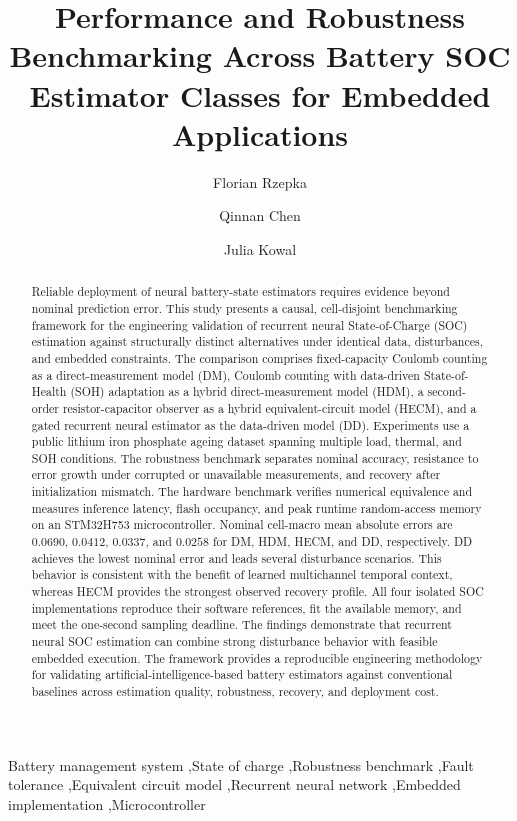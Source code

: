 \documentclass[review,nopreprintline]{elsarticle}
\date{}
\newif\ifanonsubmission
\begin{document}
\begin{frontmatter}
\title{Performance and Robustness Benchmarking Across Battery SOC Estimator Classes for Embedded Applications}
\ifanonsubmission
\author{Anonymous}
\else
\author[1]{Florian Rzepka}
\author[1]{Qinnan Chen}
\author[1]{Julia Kowal}
\fi
\begin{abstract}
Reliable deployment of neural battery-state estimators requires evidence beyond nominal prediction error. This study presents a causal, cell-disjoint benchmarking framework for the engineering validation of recurrent neural State-of-Charge (SOC) estimation against structurally distinct alternatives under identical data, disturbances, and embedded constraints. The comparison comprises fixed-capacity Coulomb counting as a direct-measurement model (DM), Coulomb counting with data-driven State-of-Health (SOH) adaptation as a hybrid direct-measurement model (HDM), a second-order resistor-capacitor observer as a hybrid equivalent-circuit model (HECM), and a gated recurrent neural estimator as the data-driven model (DD). Experiments use a public lithium iron phosphate ageing dataset spanning multiple load, thermal, and SOH conditions. The robustness benchmark separates nominal accuracy, resistance to error growth under corrupted or unavailable measurements, and recovery after initialization mismatch. The hardware benchmark verifies numerical equivalence and measures inference latency, flash occupancy, and peak runtime random-access memory on an STM32H753 microcontroller. Nominal cell-macro mean absolute errors are $0.0690$, $0.0412$, $0.0337$, and $0.0258$ for DM, HDM, HECM, and DD, respectively. DD achieves the lowest nominal error and leads several disturbance scenarios. This behavior is consistent with the benefit of learned multichannel temporal context, whereas HECM provides the strongest observed recovery profile. All four isolated SOC implementations reproduce their software references, fit the available memory, and meet the one-second sampling deadline. The findings demonstrate that recurrent neural SOC estimation can combine strong disturbance behavior with feasible embedded execution. The framework provides a reproducible engineering methodology for validating artificial-intelligence-based battery estimators against conventional baselines across estimation quality, robustness, recovery, and deployment cost.
\end{abstract}
\begin{keyword}
Battery management system \sep State of charge \sep Robustness benchmark \sep Fault tolerance \sep Equivalent circuit model \sep Recurrent neural network \sep Embedded implementation \sep Microcontroller
\end{keyword}
\end{frontmatter}
\linenumbers
\end{document}
